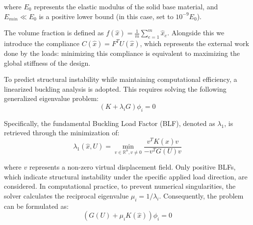 \documentclass{article}
\begin{document}
where $E_0$ represents the elastic modulus of the solid base material, and $E_{min} \ll E_0$ is a positive lower bound (in this case, set to $10^{-9}E_0$).

\vspace{\baselineskip}
The volume fraction is defined as $f(\hat{x}) = \frac{1}{m}\sum_{e=1}^m \hat{x}_e$. Alongside this we introduce the compliance $C(\hat{x}) = F^T U(\hat{x})$, which represents the external work done by the loads: minimizing this compliance is equivalent to maximizing the global stiffness of the design.

To predict structural instability while maintaining computational efficiency, a linearized buckling analysis is adopted. This requires solving the following generalized eigenvalue problem:
\begin{equation}\label{eq:lba_lambda}
(K + \lambda_i G)\phi_i = 0
\end{equation}

Specifically, the fundamental Buckling Load Factor (BLF), denoted as $\lambda_1$, is retrieved through the minimization of:
\begin{equation}\label{eq:rayleigh}
\lambda_1(\hat{x}, U) = \min_{v \in \mathbb{R}^n, v \neq 0} \frac{v^T K(\hat{x}) v}{-v^T G(U) v}
\end{equation}

where $v$ represents a non-zero virtual displacement field. Only positive BLFs, which indicate structural instability under the specific applied load direction, are considered. In computational practice, to prevent numerical singularities, the solver calculates the reciprocal eigenvalue $\mu_i = 1/\lambda_i$. Consequently, the problem can be formulated as:
\begin{equation}\label{eq:lba_mu}
(G(U) + \mu_i K(\hat{x}))\phi_i = 0
\end{equation}
\end{document}
